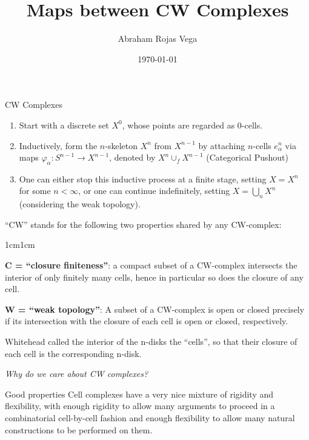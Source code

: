 \documentclass{beamer}
\title{Maps between CW Complexes}
\author{Abraham Rojas Vega}
\date{\today}
\begin{document}
\maketitle


\begin{frame}{CW Complexes}
\begin{enumerate}
    \setlength\itemsep{1.5em}
    \item Start with a discrete set $X^0$, whose points are regarded as 0-cells.
    \item Inductively, form the $n$-skeleton $X^n$ from $X^{n-1}$ by attaching $n$-cells $e_\alpha^n$ via maps $\varphi_\alpha: S^{n-1} \rightarrow X^{n-1}$, denoted by $X^n \cup _f X^{n-1}$ \alert{(Categorical Pushout)}
    \item One can either stop this inductive process at a finite stage, setting $X = X^n$ for some $n < \infty$, or one can continue indefinitely, setting $X = \bigcup_n X^n$ (considering the weak topology).
\end{enumerate}
\end{frame}    

\begin{frame}
“CW” stands for the following two properties shared by any CW-complex: 
\bigskip


\begin{adjustwidth}{1cm}{1cm}

\textbf{C = “closure finiteness”}: a compact subset of a CW-complex intersects the interior of only finitely many cells, hence in particular so does the closure of any cell.
\medskip

\textbf{W = “weak topology”}: A subset of a CW-complex is open or closed precisely if its intersection with the closure of each cell is open or closed, respectively.
\end{adjustwidth}
\bigskip

Whitehead called the interior of the n-disks the “cells”, so that their closure of each cell is the corresponding 
n-disk. \bigskip

\emph{Why do we care about CW complexes?} 

\end{frame}

\begin{frame}{Good properties}
    \vfill
Cell complexes have a very nice mixture of rigidity and flexibility, with enough rigidity to allow many arguments to proceed in a combinatorial cell-by-cell fashion and enough flexibility to allow many natural constructions to be performed on them.
\vfill
\end{frame}
\end{document}

